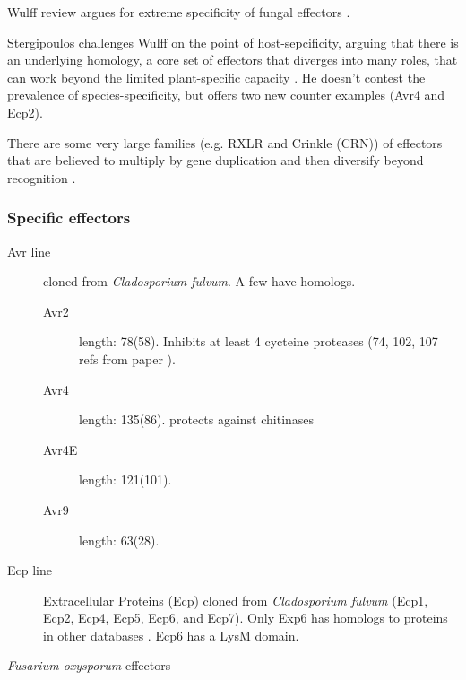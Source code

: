    Wulff review argues for extreme specificity of fungal effectors
    \cite{wulff_recognitional_2009}.
    
    Stergipoulos challenges Wulff on the point of host-sepcificity, arguing
    that there is an underlying homology, a core set of effectors that diverges
    into many roles, that can work beyond the limited plant-specific capacity
    \cite{stergiopoulos_tomato_2010}. He doesn't contest the prevalence of
    species-specificity, but offers two new counter examples (Avr4 and Ecp2).

    There are some very large families (e.g. RXLR and Crinkle (CRN)) of
    effectors that are believed to multiply by gene duplication and then
    diversify beyond recognition \cite{haas_genome_2009}.

    \subsubsection{Specific effectors}

    \begin{description}

        \item[Avr line] cloned from \textit{Cladosporium
            fulvum}. A few have homologs.

        \begin{description}
            \item[Avr2] length: 78(58). Inhibits at least 4 cycteine proteases
                (74, 102, 107 refs from paper
                \cite{stergiopoulos_fungal_2009}).
            \item[Avr4] length: 135(86). protects against chitinases
            \item[Avr4E] length: 121(101). 
            \item[Avr9]  length: 63(28).
        \end{description}

        \item[Ecp line] Extracellular Proteins (Ecp) cloned from
            \textit{Cladosporium fulvum} (Ecp1, Ecp2, Ecp4, Ecp5, Ecp6, and
            Ecp7). Only Exp6 has homologs to proteins in other databases
            \cite{stergiopoulos_fungal_2009}. Ecp6 has a LysM domain.

        \item[\textit{Fusarium oxysporum} effectors]

    \end{description}


